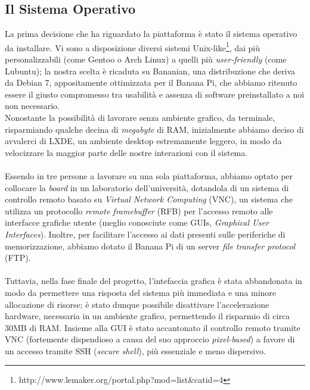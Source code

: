 \subsection{Il Sistema Operativo}
La prima decisione che ha riguardato la piattaforma è stato il sistema 
operativo da installare. Vi sono a disposizione diversi sistemi 
Unix-like\footnote{http://www.lemaker.org/portal.php?mod=list\&catid=4}, 
dai più personalizzabili (come Gentoo o Arch Linux) a quelli più
 \emph{user-friendly} (come Lubuntu); la nostra scelta è ricaduta su Bananian, 
una distribuzione che deriva da Debian 7, appositamente ottimizzata per il 
Banana Pi, che abbiamo ritenuto essere il giusto compromesso tra usabilità
e assenza di software preinstallato a noi non necessario. \\
Nonostante la possibilità di lavorare senza ambiente grafico, da terminale, 
risparmiando qualche decina di \emph{megabyte} di RAM, inizialmente abbiamo 
deciso di avvalerci di LXDE, un ambiente desktop estremamente leggero, in modo 
da 
velocizzare la maggior parte delle nostre interazioni con il sistema.
\\ \\
Essendo in tre persone a lavorare su una sola piattaforma, abbiamo optato 
per collocare la \emph{board} in un laboratorio dell'università, dotandola
di un sistema di controllo remoto basato su \emph{Virtual Network Computing} 
(VNC), un sistema che utilizza un protocollo \emph{remote framebuffer} (RFB) 
per l'accesso remoto alle interfacce grafiche utente (meglio conosciute come 
GUIs, \emph{Graphical User Interfaces}). Inoltre, 
per facilitare l'accesso ai dati presenti sulle periferiche di memorizzazione, 
abbiamo dotato il Banana Pi di un server \emph{file transfer protocol} (FTP).
\\ \\
Tuttavia, nella fase finale del progetto, l'intefaccia grafica è stata 
abbandonata in modo da permettere una risposta del sistema più immediata e una 
minore allocazione di risorse; è stato dunque possibile disattivare 
l'accelerazione hardware, necessaria in un ambiente grafico, permettendo il 
risparmio di circa 30MB di RAM. Insieme alla GUI è stato accantonato il 
controllo remoto tramite VNC (fortemente dispendioso a causa del suo approccio 
\emph{pixel-based}) a favore di un accesso tramite SSH (\emph{secure shell}), 
più essenziale e meno dispersivo.
